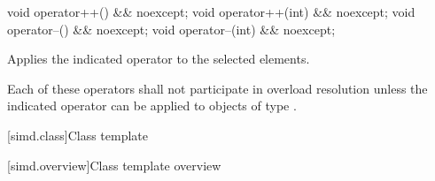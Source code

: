 \begin{itemdecl}
void operator++() && noexcept;
void operator++(int) && noexcept;
void operator--() && noexcept;
void operator--(int) && noexcept;
\end{itemdecl}

\begin{itemdescr}
  \pnum\effects
  Applies the indicated operator to the selected elements.

  \pnum\remarks
  Each of these operators shall not participate in overload resolution unless the indicated operator can be applied to objects of type .
\end{itemdescr}

[simd.class]{Class template }

[simd.overview]{Class template  overview}

